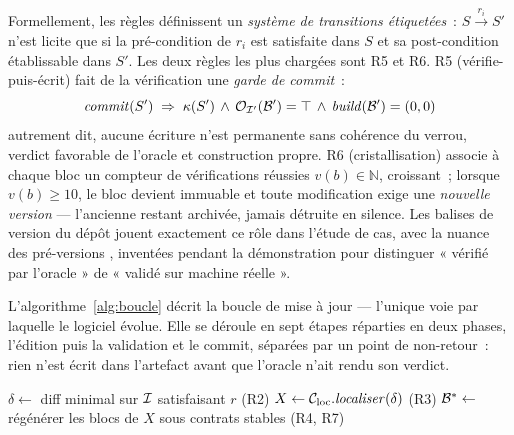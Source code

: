 Formellement, les règles définissent un \emph{système de transitions
étiquetées}~: $S \xrightarrow{\;r_i\;} S'$ n’est licite que si la
pré-condition de $r_i$ est satisfaite dans $S$ et sa post-condition
établissable dans $S'$. Les deux règles les plus chargées sont R5 et R6.
R5 (vérifie-puis-écrit) fait de la vérification une \emph{garde de commit}~:
\begin{equation}\label{eq:r5}
\mathit{commit}(S') \;\Rightarrow\; \kappa(S') \,\wedge\,
\mathcal{O}_{\mathcal{I}'}(\mathcal{B}') = \top \,\wedge\, \mathit{build}(\mathcal{B}') = (0,0)
\end{equation}
autrement dit, aucune écriture n’est permanente sans cohérence du verrou,
verdict favorable de l’oracle et construction propre. R6
(cristallisation) associe à chaque bloc un compteur de vérifications
réussies $v(b) \in \mathbb{N}$, croissant~; lorsque $v(b) \geq 10$, le bloc
devient immuable et toute modification exige une \emph{nouvelle version} —
l’ancienne restant archivée, jamais détruite en silence. Les balises de
version du dépôt jouent exactement ce rôle dans l’étude de cas, avec la
nuance des pré-versions , inventées pendant la démonstration
pour distinguer « vérifié par l’oracle » de « validé sur machine
réelle ».

L’algorithme~\ref{alg:boucle} décrit la boucle de mise à jour — l’unique
voie par laquelle le logiciel évolue. Elle se déroule en sept étapes
réparties en deux phases, l’édition puis la validation et le commit,
séparées par un point de non-retour~: rien n’est écrit dans l’artefact
avant que l’oracle n’ait rendu son verdict.

\begin{algorithm}[t]
\SetAlgoLined
{}
$\delta \leftarrow$ diff minimal sur $\mathcal{I}$ satisfaisant $r$
\quad\textnormal{(R2)}\;
$X \leftarrow \mathcal{C}_{\mathrm{loc}}.\mathit{localiser}(\delta)$
\quad\textnormal{(R3)}\;
$\mathcal{B}^{*} \leftarrow$ régénérer les blocs de $X$ sous contrats stables
\textnormal{(R4, R7)}\;
\caption{Boucle de mise à jour TRIADE.}
\label{alg:boucle}
\end{algorithm}


